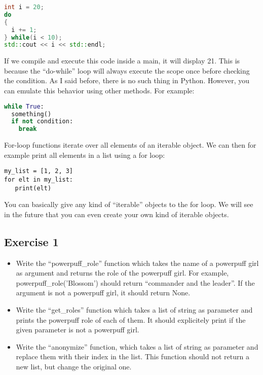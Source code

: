\begin{lstlisting}[language=C++]
int i = 20;
do
{
  i += 1;
} while(i < 10);
std::cout << i << std::endl;
\end{lstlisting}

If we compile and execute this code inside a main, it will display 21. This is because
the ``do-while'' loop will always execute the scope once before checking the condition.
As I said before, there is no such thing in Python. However, you can emulate this behavior
using other methods. For example:

\begin{lstlisting}[language=python]
while True:
  something()
  if not condition:
    break
\end{lstlisting}

For-loop functions iterate over all elements of an iterable object. We can then for example
print all elements in a list using a for loop:

\begin{lstlisting}
my_list = [1, 2, 3]
for elt in my_list:
   print(elt)
\end{lstlisting}

You can basically give any kind of ``iterable'' objects to the for loop. We will see in the future
that you can even create your own kind of iterable objects.

\subsection{Exercise 1}

\begin{itemize}
\item Write the ``powerpuff\_role'' function which takes the name of a powerpuff girl as argument
  and returns the role of the powerpuff girl. For example, powerpuff\_role('Blossom') should return
  ``commander and the leader''. If the argument is not a powerpuff girl, it should return None.
\item Write the ``get\_roles'' function which takes a list of string as parameter and prints the powerpuff role
  of each of them. It should explicitely print if the given parameter is not a powerpuff girl.
\item Write the ``anonymize'' function, which takes a list of string as parameter and replace them with their index
  in the list. This function should not return a new list, but change the original one.
\end{itemize}


